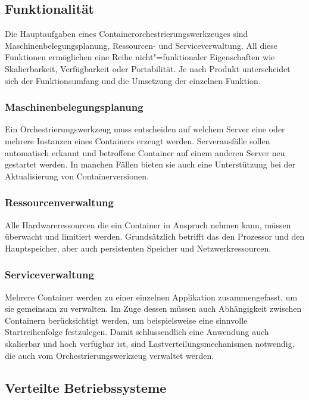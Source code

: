 \subsection{Funktionalität}

Die Hauptaufgaben eines Containerorchestrierungswerkzeuges sind Maschinenbelegungsplanung, Ressourcen- und Serviceverwaltung. All diese Funktionen ermöglichen eine Reihe nicht"=funktionaler Eigenschaften wie Skalierbarkeit, Verfügbarkeit oder Portabilität. Je nach Produkt unterscheidet sich der Funktionsumfang und die Umsetzung der einzelnen Funktion.

\subsubsection{Maschinenbelegungsplanung}

Ein Orchestrierungswerkzeug muss entscheiden auf welchem Server eine oder mehrere Instanzen eines Containers erzeugt werden. Serverausfälle sollen automatisch erkannt und betroffene Container auf einem anderen Server neu gestartet werden. In manchen Fällen bieten sie auch eine Unterstützung bei der Aktualisierung von Containerversionen.

\subsubsection{Ressourcenverwaltung}

Alle Hardwareressourcen die ein Container in Anspruch nehmen kann, müssen überwacht und limitiert werden. Grundsätzlich betrifft das den Prozessor und den Hauptspeicher, aber auch persistenten Speicher und Netzwerkressourcen.

\subsubsection{Serviceverwaltung}

Mehrere Container werden zu einer einzelnen Applikation zusammengefasst, um sie gemeinsam zu verwalten. Im Zuge dessen müssen auch Abhängigkeit zwischen Containern berücksichtigt werden, um beispielsweise eine sinnvolle Startreihenfolge festzulegen. Damit schlussendlich eine Anwendung auch skalierbar und hoch verfügbar ist, sind Lastverteilungsmechanismen notwendig, die auch vom Orchestrierungswerkzeug verwaltet werden.

\subsection{Verteilte Betriebssysteme}

